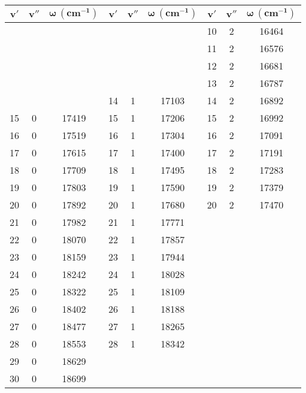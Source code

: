 \documentclass[../labs.tex]{subfiles}
\begin{document}
\begin{table}[H]
    \centering
    \small
    \renewcommand{\arraystretch}{1.2}
    \begin{tabular}{|c|c|c|c|c|c|c|c|c|}
        \hline
        $\bm{v'}$ & $\bm{v''}$ & $\bm{\omega\ (\textbf{cm}^{-1})}$ & $\bm{v'}$ & $\bm{v''}$ & $\bm{\omega\ (\textbf{cm}^{-1})}$ & $\bm{v'}$ & $\bm{v''}$ & $\bm{\omega\ (\textbf{cm}^{-1})}$\\
        \hline
           &   &       &    &   &       & 10 & 2 & 16464\\ \hline
           &   &       &    &   &       & 11 & 2 & 16576\\ \hline
           &   &       &    &   &       & 12 & 2 & 16681\\ \hline
           &   &       &    &   &       & 13 & 2 & 16787\\ \hline
           &   &       & 14 & 1 & 17103 & 14 & 2 & 16892\\ \hline
        15 & 0 & 17419 & 15 & 1 & 17206 & 15 & 2 & 16992\\ \hline
        16 & 0 & 17519 & 16 & 1 & 17304 & 16 & 2 & 17091\\ \hline
        17 & 0 & 17615 & 17 & 1 & 17400 & 17 & 2 & 17191\\ \hline
        18 & 0 & 17709 & 18 & 1 & 17495 & 18 & 2 & 17283\\ \hline
        19 & 0 & 17803 & 19 & 1 & 17590 & 19 & 2 & 17379\\ \hline
        20 & 0 & 17892 & 20 & 1 & 17680 & 20 & 2 & 17470\\ \hline
        21 & 0 & 17982 & 21 & 1 & 17771 &    &   &      \\ \hline
        22 & 0 & 18070 & 22 & 1 & 17857 &    &   &      \\ \hline
        23 & 0 & 18159 & 23 & 1 & 17944 &    &   &      \\ \hline
        24 & 0 & 18242 & 24 & 1 & 18028 &    &   &      \\ \hline
        25 & 0 & 18322 & 25 & 1 & 18109 &    &   &      \\ \hline
        26 & 0 & 18402 & 26 & 1 & 18188 &    &   &      \\ \hline
        27 & 0 & 18477 & 27 & 1 & 18265 &    &   &      \\ \hline
        28 & 0 & 18553 & 28 & 1 & 18342 &    &   &      \\ \hline
        29 & 0 & 18629 &    &   &       &    &   &      \\ \hline
        30 & 0 & 18699 &    &   &       &    &   &      \\ \hline

\end{tabular}
\end{table}
\end{document}
